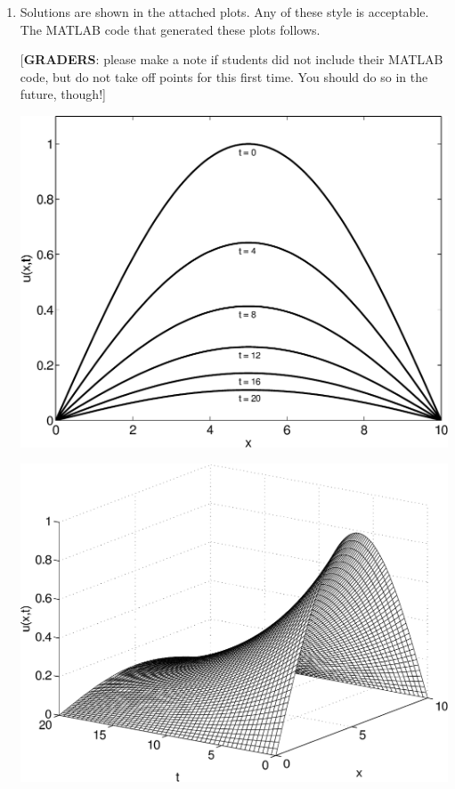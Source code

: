 \begin{solution}
\begin{enumerate}
\item Solutions are shown in the attached plots.  Any of these style is acceptable. 
      The MATLAB code that generated these plots follows. 

      [\textbf{GRADERS}: please make a note if students did not include their MATLAB code,
       but do not take off points for this first time.  You should do so in the future, though!]
        
      \begin{center}
           \includegraphics[scale=0.53]{checksol1}

           \includegraphics[scale=0.53]{checksol2}


\end{center}
\end{enumerate}
\end{solution}
